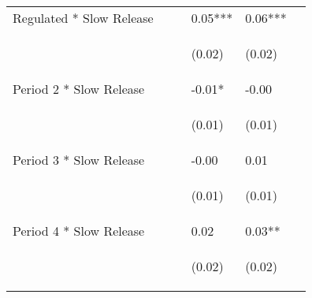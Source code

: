 \documentclass[12pt]{article}
\begin{document}
\begin{center}
\begin{longtable}{p{}p{}p{}p{}p{}p{}}
Regulated * Slow Release &  &  & 0.05*** & 0.06*** \\
\vspace{2pt} & \begin{footnotesize}\end{footnotesize} & \begin{footnotesize}\end{footnotesize} & \begin{footnotesize}(0.02)\end{footnotesize} & \begin{footnotesize}(0.02)\end{footnotesize} \\
Period 2 * Slow Release &  &  & -0.01* & -0.00 \\
\vspace{2pt} & \begin{footnotesize}\end{footnotesize} & \begin{footnotesize}\end{footnotesize} & \begin{footnotesize}(0.01)\end{footnotesize} & \begin{footnotesize}(0.01)\end{footnotesize} \\
Period 3 * Slow Release &  &  & -0.00 & 0.01 \\
\vspace{2pt} & \begin{footnotesize}\end{footnotesize} & \begin{footnotesize}\end{footnotesize} & \begin{footnotesize}(0.01)\end{footnotesize} & \begin{footnotesize}(0.01)\end{footnotesize} \\
Period 4 * Slow Release &  &  & 0.02 & 0.03** \\
\vspace{2pt} & \begin{footnotesize}\end{footnotesize} & \begin{footnotesize}\end{footnotesize} & \begin{footnotesize}(0.02)\end{footnotesize} & \begin{footnotesize}(0.02)\end{footnotesize} \\

\end{longtable}
\end{center}
\end{document}
